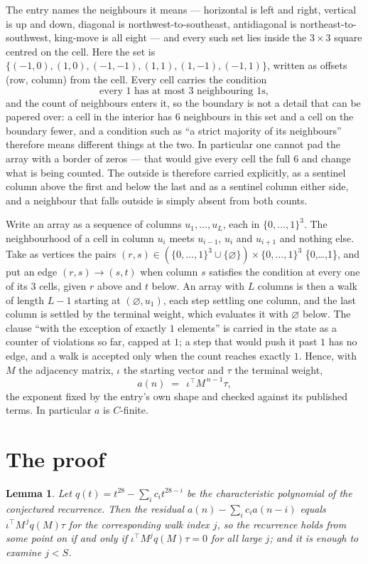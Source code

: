 \documentclass[11pt,a4paper]{article}
\theoremstyle{plain}
\newtheorem{lemma}[theorem]{Lemma}
\theoremstyle{definition}
\begin{document}
The entry names the neighbours it means --- horizontal is left and right, vertical is up and
down, diagonal is northwest-to-southeast, antidiagonal is northeast-to-southwest, king-move is
all eight --- and every such set lies inside the $3\times3$ square centred on the cell. Here
the set is $\{(-1,0), (1,0), (-1,-1), (1,1), (1,-1), (-1,1)\}$, written as offsets (row, column) from the cell. Every cell carries
the condition
\[
\text{every 1 has at most 3 neighbouring 1s},
\]
and the count of neighbours enters it, so the boundary is not a detail that can be papered
over: a cell in the interior has $6$ neighbours in this set and a cell on the boundary
fewer, and a condition such as ``a strict majority of its neighbours'' therefore means
different things at the two. In particular one cannot pad the array with a border of zeros ---
that would give every cell the full $6$ and change what is being counted. The outside is
therefore carried
explicitly, as a sentinel column above the first and below the last and as a sentinel column
either side, and a neighbour that falls outside is simply absent from both counts.

Write an array as a sequence of columns $u_1,\dots,u_L$, each in
$\{0,\dots,1\}^{3}$. The neighbourhood of a cell in column $u_i$ meets $u_{i-1}$,
$u_i$ and $u_{i+1}$ and nothing else. Take as vertices the pairs
$(r,s)\in(\{0,\dots,1\}^{3}\cup\{\varnothing\})\times\{0,\dots,1\}^{3}$ \times \{0,\dots,1\},
and put an edge $(r,s)\to(s,t)$ when column $s$ satisfies the condition at every one of its
$3$ cells, given $r$ above and $t$ below. An array with $L$ columns is then a walk of length
$L-1$ starting at $(\varnothing,u_1)$, each step settling one column, and the last column is
settled by the terminal weight, which evaluates it with $\varnothing$ below. The clause ``with the exception of exactly $1$ elements'' is carried in
the state as a counter of violations so far, capped at $1$; a step that would push it past
$1$ has no edge, and a walk is accepted only when the count reaches exactly $1$. Hence,
with $M$ the adjacency matrix, $\iota$ the starting vector and $\tau$ the terminal weight,
\[
a(n)\;=\;\,\iota^{\!\top}M^{\,n-1}\tau ,
\]
the exponent fixed by the entry's own shape and checked against its published terms. In
particular $a$ is $C$-finite.

\section{The proof}

\begin{lemma}\label{lem:crit}
Let $q(t)=t^{28}-\sum_i c_it^{28-i}$ be the characteristic polynomial of the
conjectured recurrence. Then the residual $a(n)-\sum_ic_ia(n-i)$ equals
$\iota^{\!\top}M^{\,j}q(M)\tau$ for the corresponding walk index $j$, so the
recurrence holds from some point on if and only if $\iota^{\!\top}M^{j}q(M)\tau=0$ for all
large $j$; and it is enough to examine $j<S$.
\end{lemma}
\end{document}
